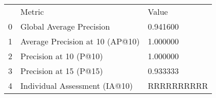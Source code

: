 \begin{tabular}{lll}
 & Metric & Value \\
0 & Global Average Precision & 0.941600 \\
1 & Average Precision at 10 (AP@10) & 1.000000 \\
2 & Precision at 10 (P@10) & 1.000000 \\
3 & Precision at 15 (P@15) & 0.933333 \\
4 & Individual Assessment (IA@10) & RRRRRRRRRR \\
\end{tabular}
